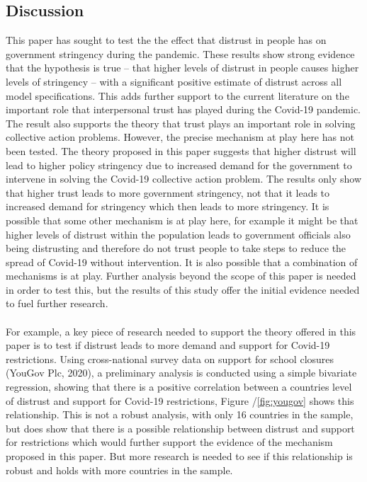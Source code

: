 \documentclass[
  12pt,
]{article}
\begin{document}
\hypertarget{discussion}{%
\subsection{Discussion}\label{discussion}}

This paper has sought to test the the effect that distrust in people has on government stringency during the pandemic. These results show strong evidence that the hypothesis is true -- that higher levels of distrust in people causes higher levels of stringency -- with a significant positive estimate of distrust across all model specifications. This adds further support to the current literature on the important role that interpersonal trust has played during the Covid-19 pandemic. The result also supports the theory that trust plays an important role in solving collective action problems. However, the precise mechanism at play here has not been tested. The theory proposed in this paper suggests that higher distrust will lead to higher policy stringency due to increased demand for the government to intervene in solving the Covid-19 collective action problem. The results only show that higher trust leads to more government stringency, not that it leads to increased demand for stringency which then leads to more stringency. It is possible that some other mechanism is at play here, for example it might be that higher levels of distrust within the population leads to government officials also being distrusting and therefore do not trust people to take steps to reduce the spread of Covid-19 without intervention. It is also possible that a combination of mechanisms is at play. Further analysis beyond the scope of this paper is needed in order to test this, but the results of this study offer the initial evidence needed to fuel further research.\\
~\\
For example, a key piece of research needed to support the theory offered in this paper is to test if distrust leads to more demand and support for Covid-19 restrictions. Using cross-national survey data on support for school closures (YouGov Plc, 2020), a preliminary analysis is conducted using a simple bivariate regression, showing that there is a positive correlation between a countries level of distrust and support for Covid-19 restrictions, Figure /\ref{fig:yougov} shows this relationship. This is not a robust analysis, with only 16 countries in the sample, but does show that there is a possible relationship between distrust and support for restrictions which would further support the evidence of the mechanism proposed in this paper. But more research is needed to see if this relationship is robust and holds with more countries in the sample.\\
~\\
\end{document}
